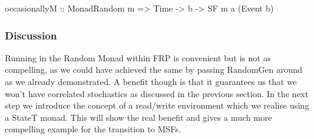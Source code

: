 \begin{HaskellCode}
occasionallyM :: MonadRandom m => Time -> b -> SF m a (Event b)
\end{HaskellCode}

\subsubsection{Discussion} 
Running in the Random Monad within FRP is convenient but is not as compelling, as we could have achieved the same by passing RandomGen around as we already demonstrated. A benefit though is that it guarantees us that we won't have correlated stochastics as discussed in the previous section. In the next step we introduce the concept of a read/write environment which we realise using a StateT monad. This will show the real benefit and gives a much more compelling example for the transition to MSFs.